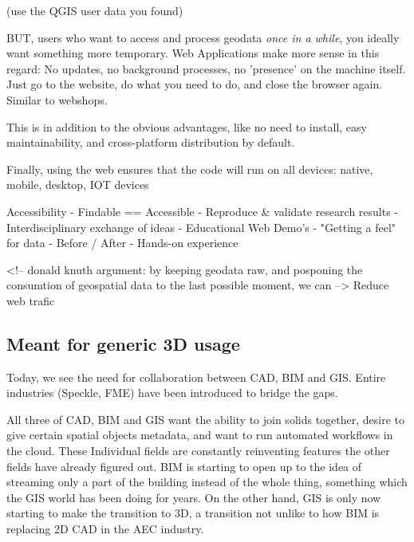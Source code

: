 (use the QGIS user data you found)

BUT, users who want to access and process geodata \emph{once in a while}, you ideally want something more temporary. Web Applications make more sense in this regard: No updates, no background processes, no 'presence' on the machine itself. Just go to the website, do what you need to do, and close the browser again. Similar to webshops.

This is in addition to the obvious advantages, like no need to install, easy maintainability, and cross-platform distribution by default.

Finally, using the web ensures that the code will run on all devices: native, mobile, desktop, IOT devices


Accessibility
- Findable == Accessible
- Reproduce \& validate research results 
- Interdisciplinary exchange of ideas 
- Educational Web Demo's
- "Getting a feel" for data 
   - Before / After
   - Hands-on experience

<!-- donald knuth argument: by keeping geodata raw, and posponing the consumtion of geospatial data to the last possible moment, we can  -->
Reduce web trafic

\subsection{Meant for generic 3D usage}


Today, we see the need for collaboration between CAD, BIM and GIS. Entire industries (Speckle, FME) have been introduced to bridge the gaps. 

All three of CAD, BIM and GIS want the ability to join solids together, desire to give certain spatial objects metadata, and want to run automated workflows in the cloud. These Individual fields are constantly reinventing features the other fields have already figured out. BIM is starting to open up to the idea of streaming only a part of the building instead of the whole thing, something which the GIS world has been doing for years. On the other hand, GIS is only now starting to make the transition to 3D, a transition not unlike to how BIM is replacing 2D CAD in the AEC industry. 

